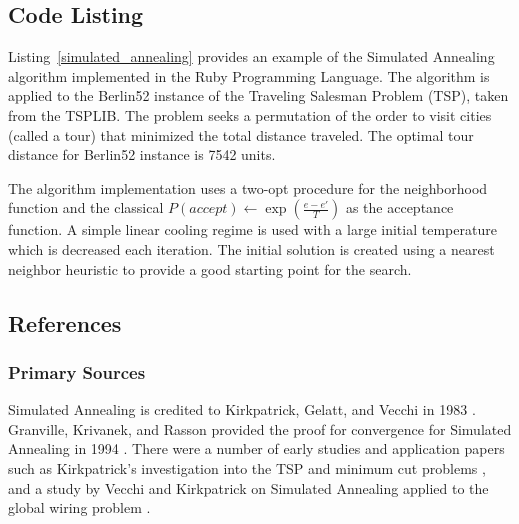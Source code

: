 \subsection{Code Listing}
Listing~\ref{simulated_annealing} provides an example of the Simulated Annealing algorithm implemented in the Ruby Programming Language. 
The algorithm is applied to the Berlin52 instance of the Traveling Salesman Problem (TSP), taken from the TSPLIB. The problem seeks a permutation of the order to visit cities (called a tour) that minimized the total distance traveled. The optimal tour distance for Berlin52 instance is 7542 units.

The algorithm implementation uses a two-opt procedure for the neighborhood function and the classical $P(accept) \leftarrow \exp(\frac{e-e'}{T})$ as the acceptance function. A simple linear cooling regime is used with a large initial temperature which is decreased each iteration. The initial solution is created using a nearest neighbor heuristic to provide a good starting point for the search.



\subsection{References}

% 
% 
\subsubsection{Primary Sources}
Simulated Annealing is credited to Kirkpatrick, Gelatt, and Vecchi in 1983 \cite{Kirkpatrick1983}. Granville, Krivanek, and Rasson provided the proof for convergence for Simulated Annealing in 1994 \cite{Granville1994}.
There were a number of early studies and application papers such as Kirkpatrick's investigation into the TSP and minimum cut problems \cite{Kirkpatrick1983a}, and a study by Vecchi and Kirkpatrick on Simulated Annealing applied to the global wiring problem \cite{Vecchi1983}.

